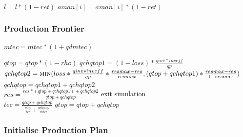 \documentclass{article}
\begin{document}
\begin{algorithm}[!htbp]
\caption{Luupdate (Firm)}
    \begin{algorithmic}
        \State \(l = l *(1-ret)\)
        \State \(aman\left[i\right] = aman\left[i\right] * (1 - ret)\)
        \EndFor
        \EndFunction
    \end{algorithmic}
\end{algorithm}

\subsubsection{Production Frontier}

\begin{algorithm}[H]
\caption{Prodfront}
    \begin{algorithmic}
        \State \(mtec = mtec * (1 + qdmtec)\)
        \EndFor
        \State {}
        \EndFor
        \EndFunction
    \end{algorithmic}
\end{algorithm}

\begin{algorithm}[!htbp]
\caption{Prodfront (Firm)}
    \begin{algorithmic}
        \State \(qtop = qtop * (1 - rho)\)
        \State \(qchqtop1 = (1 - loss) * \frac{qinv * inveff}{qp}\)
        \State \(qchqtop2 = \Call{min}{loss * \frac{qinv * inveff}{qp} * \frac{resmax-res}{resmax}, (qtop + qchqtop1) * \frac{resmax - res}{1 - resmax}}\)
        \State \(qchqtop = qchqtop1 + qchqtop2\)
        \\
        \State \(res = \frac{res * (qtop + qchqtop1) + qchqtop2}{qtop + qchqtop}\)
        \State exit simulation
        \EndIf
        \\
        \State \(tec = \frac{qtop + qchqtop}{\frac{qtop}{tec} + \frac{qchqtop}{mtec}}\)
        \State \(qtop = qtop + qchqtop\)
        \EndFunction
    \end{algorithmic}
\end{algorithm}

\subsubsection{Initialise Production Plan}
\end{document}

